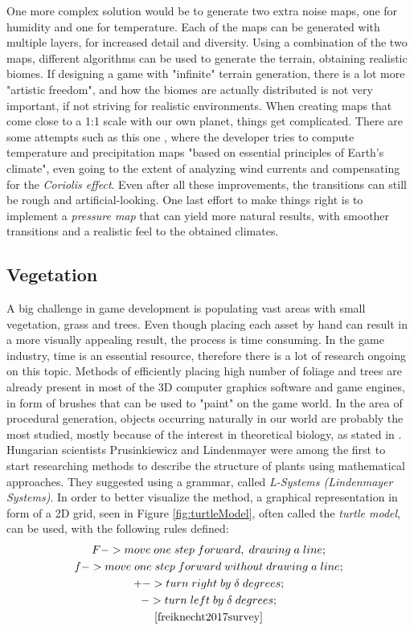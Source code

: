 One more complex solution would be to generate two extra noise maps, one for humidity and one for temperature. Each of the maps can be generated with multiple layers, for increased detail and diversity. Using a combination of the two maps, different algorithms can be used to generate the terrain, obtaining realistic biomes. If designing a game with "infinite" terrain generation, there is a lot more "artistic freedom", and how the biomes are actually distributed is not very important, if not striving for realistic environments. When creating maps that come close to a 1:1 scale with our own planet, things get complicated. There are some attempts such as this one \cite{biomes}, where the developer tries to compute temperature and precipitation maps "based on essential principles of Earth's climate", even going to the extent of analyzing wind currents and compensating for the \textit{Coriolis effect}. Even after all these improvements, the transitions can still be rough and artificial-looking. One last effort to make things right is to implement a \textit{pressure map} that can yield more natural results, with smoother transitions and a realistic feel to the obtained climates.

\subsection{Vegetation}

A big challenge in game development is populating vast areas with small vegetation, grass and trees. Even though placing each asset by hand can result in a more visually appealing result, the process is time consuming. In the game industry, time is an essential resource, therefore there is a lot of research ongoing on this topic. Methods of efficiently placing high number of foliage and trees are already present in most of the 3D computer graphics software and game engines, in form of brushes that can be used to "paint" on the game world. In the area of procedural generation, objects occurring naturally in our world are probably the most studied, mostly because of the interest in theoretical biology, as stated in \cite{freiknecht2017survey}. Hungarian scientists Prusinkiewicz and Lindenmayer were among the first to start researching methods to describe the structure of plants using mathematical approaches. They suggested using a grammar, called \textit{L-Systems (Lindenmayer Systems)}. In order to better visualize the method, a graphical representation in form of a 2D grid, seen in Figure \ref{fig:turtleModel}, often called the \textit{turtle model}, can be used, with the following rules defined:
\begin{gather*}
    F->move\;one\;step\;forward,\;drawing\;a\;line;\\
    f->move\;one\;step\;forward\;without\;drawing\;a\;line;\\
    +->turn\;right\;by\;\delta\;degrees;\\
    ->turn\;left\;by\;\delta\;degrees;\\
    \cite{freiknecht2017survey}
\end{gather*}

